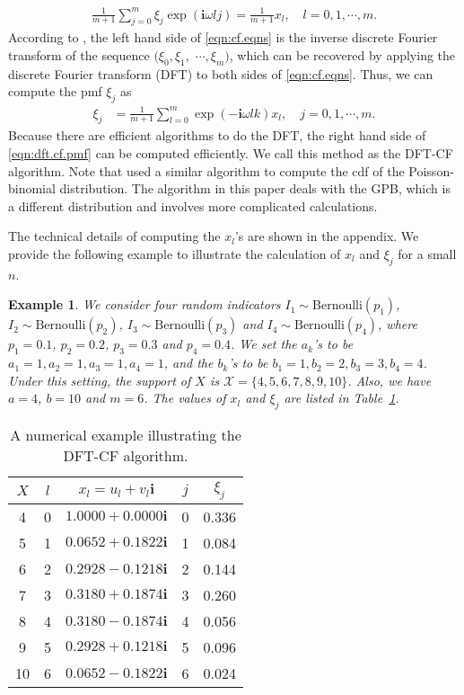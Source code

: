 \documentclass[12pt]{article}
\newcommand{\Xset}{\mathcal{X}}
\newcommand{\ber}{\textrm{Bernoulli}}
\newcommand{\ivec}{{\boldsymbol{i}}}
\newtheorem{example}{Example}
\begin{document}
\begin{align}\label{eqn:cf.eqns}
\frac{1}{m+1}\sum_{j=0}^m\xi_j\exp(\ivec\omega lj)=\frac{1}{m+1}x_l, \quad l=0,1,\cdots,m.
\end{align}
According to , the left hand side of \eqref{eqn:cf.eqns} is the inverse discrete Fourier transform of the sequence $(\xi_0,\xi_1,$ $\cdots,\xi_m)$, which can be recovered by applying the discrete Fourier transform (DFT) to both sides of \eqref{eqn:cf.eqns}. Thus, we can compute the pmf $\xi_j$ as
\begin{align}\label{eqn:dft.cf.pmf}
\xi_j&=\frac{1}{m+1}\sum_{l=0}^{m}\exp(-\ivec\omega lk)x_l, \quad j=0,1,\cdots, m.
\end{align}
Because there are efficient algorithms to do the DFT, the right hand side of \eqref{eqn:dft.cf.pmf} can be computed efficiently. We call this method as the DFT-CF algorithm. Note that  used a similar algorithm to compute the cdf of the Poisson-binomial distribution. The algorithm in this paper deals with the GPB, which is a different distribution and involves more complicated calculations.

The technical details of computing the $x_l$'s are shown in the appendix. We provide the following example to illustrate the calculation of $x_l$ and $\xi_j$ for a small $n$.


\begin{example}
We consider four random indicators $I_1\sim\ber(p_1)$, $I_2\sim\ber(p_2)$, $I_3\sim\ber(p_3)$ and $I_4\sim\ber(p_4)$, where $p_1=0.1$, $p_2=0.2$, $p_3=0.3$ and $p_4=0.4$. We set the $a_k$'s to be $a_1=1, a_2=1, a_3=1, a_4=1$, and the $b_k$'s to be $b_1=1, b_2=2, b_3=3, b_4=4$. Under this setting, the support of $X$ is $\Xset=\{4, 5, 6, 7, 8, 9, 10\}$. Also, we have $a=4$, $b=10$ and $m=6$.  The values of $x_l$ and $\xi_j$ are listed in Table~\ref{tab:numericexample}.
\end{example}
%

\begin{table}
\caption{A numerical example illustrating the DFT-CF algorithm.} \label{tab:numericexample}
\vspace{1ex}
\begin{center}
\begin{tabular}{c |c c |c  c }
\hline\hline
$X$ & $l$  & $x_l=u_l+v_l\ivec  $ &$j$& $\xi_j$  \\\hline
4   & 0    & $1.0000+0.0000\ivec$ & 0 & 0.336 \\
5   & 1    & $0.0652+0.1822\ivec$ & 1 & 0.084 \\
6   & 2    & $0.2928-0.1218\ivec$ & 2 & 0.144 \\
7   & 3    & $0.3180+0.1874\ivec$ & 3 & 0.260 \\
8   & 4    & $0.3180-0.1874\ivec$ & 4 & 0.056 \\
9   & 5    & $0.2928+0.1218\ivec$ & 5 & 0.096 \\
10  & 6    & $0.0652-0.1822\ivec$ & 6 & 0.024 \\
\hline\hline
\end{tabular}
\end{center}
\end{table}
\end{document}
